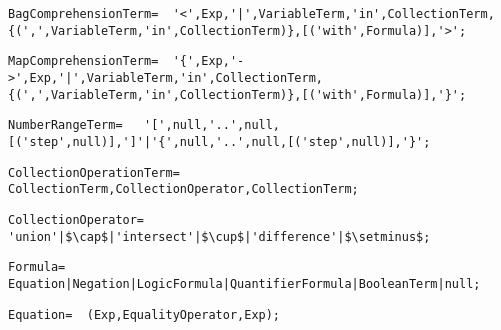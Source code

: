 \documentclass{article}
\begin{document}
    \begin{flushleft}
    \begin{lstlisting}[mathescape=true, breaklines=true]
     BagComprehensionTerm= 	'<',Exp,'|',VariableTerm,'in',CollectionTerm,{(',',VariableTerm,'in',CollectionTerm)},[('with',Formula)],'>';
    \end{lstlisting}
    \end{flushleft}
    \begin{flushleft}
    \begin{lstlisting}[mathescape=true, breaklines=true]
     MapComprehensionTerm= 	'{',Exp,'->',Exp,'|',VariableTerm,'in',CollectionTerm,{(',',VariableTerm,'in',CollectionTerm)},[('with',Formula)],'}';
    \end{lstlisting}
    \end{flushleft}
    \begin{flushleft}
    \begin{lstlisting}[mathescape=true, breaklines=true]
     NumberRangeTerm= 	'[',null,'..',null,[('step',null)],']'|'{',null,'..',null,[('step',null)],'}';
    \end{lstlisting}
    \end{flushleft}
    \begin{flushleft}
    \begin{lstlisting}[mathescape=true, breaklines=true]
     CollectionOperationTerm= 	CollectionTerm,CollectionOperator,CollectionTerm;
    \end{lstlisting}
    \end{flushleft}
    \begin{flushleft}
    \begin{lstlisting}[mathescape=true, breaklines=true]
     CollectionOperator= 	'union'|$\cap$|'intersect'|$\cup$|'difference'|$\setminus$;
    \end{lstlisting}
    \end{flushleft}
    \begin{flushleft}
    \begin{lstlisting}[mathescape=true, breaklines=true]
     Formula= 	Equation|Negation|LogicFormula|QuantifierFormula|BooleanTerm|null;
    \end{lstlisting}
    \end{flushleft}
    \begin{flushleft}
    \begin{lstlisting}[mathescape=true, breaklines=true]
     Equation= 	(Exp,EqualityOperator,Exp);
    \end{lstlisting}
    \end{flushleft}
\end{document}
